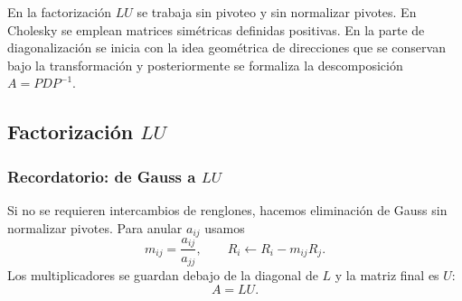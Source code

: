 \documentclass[12pt]{article}
\theoremstyle{remark}
\begin{document}
En la factorización \(LU\) se trabaja sin pivoteo y sin normalizar pivotes. En Cholesky se emplean matrices simétricas definidas positivas. En la parte de diagonalización se inicia con la idea geométrica de direcciones que se conservan bajo la transformación y posteriormente se formaliza la descomposición \(A=PDP^{-1}\).

\subsection*{Factorización $LU$}
\subsubsection*{Recordatorio: de Gauss a $LU$}

Si no se requieren intercambios de renglones, hacemos eliminación de Gauss sin normalizar pivotes. Para anular $a_{ij}$ usamos
\[
m_{ij}=\frac{a_{ij}}{a_{jj}},\qquad R_i\leftarrow R_i-m_{ij}R_j.
\]
Los multiplicadores se guardan debajo de la diagonal de $L$ y la matriz final es $U$:
\[
\boxed{A=LU}.
\]
\end{document}
